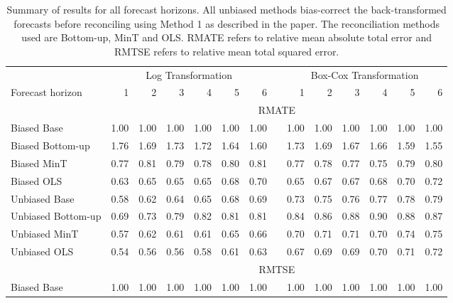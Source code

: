 \documentclass[12pt]{article}
\begin{document}
\begin{table}[htbp]
  \centering\footnotesize
  \caption{Summary of results for all forecast horizons.  All unbiased methods bias-correct the back-transformed forecasts before reconciling using Method 1 as described in the paper.  The reconciliation methods used are Bottom-up, MinT and OLS.  RMATE refers to relative mean absolute total error and RMTSE refers to relative mean total squared error.}
    \begin{tabular}{lrrrrrrrrrrrrr}
    \toprule
    & \multicolumn{6}{c}{Log Transformation}         &       & \multicolumn{6}{c}{Box-Cox Transformation} \\\cmidrule(lr){2-7}\cmidrule(lr){9-14}
    Forecast horizon  & 1     & 2     & 3     & 4     & 5     & 6     &       & 1     & 2     & 3     & 4     & 5     & 6 \\\midrule
          & \multicolumn{13}{c}{RMATE} \\ \cmidrule(lr){2-14}
    Biased Base             & 1.00  & 1.00  & 1.00  & 1.00  & 1.00  & 1.00  &       & 1.00  & 1.00  & 1.00  & 1.00  & 1.00  & 1.00 \\
    Biased Bottom-up        & 1.76  & 1.69  & 1.73  & 1.72  & 1.64  & 1.60  &       & 1.73  & 1.69  & 1.67  & 1.66  & 1.59  & 1.55 \\
    Biased MinT             & 0.77  & 0.81  & 0.79  & 0.78  & 0.80  & 0.81  &       & 0.77  & 0.78  & 0.77  & 0.75  & 0.79  & 0.80 \\
    Biased OLS              & 0.63  & 0.65  & 0.65  & 0.65  & 0.68  & 0.70  &       & 0.65  & 0.67  & 0.67  & 0.68  & 0.70  & 0.72 \\
    Unbiased Base           & 0.58  & 0.62  & 0.64  & 0.65  & 0.68  & 0.69  &       & 0.73  & 0.75  & 0.76  & 0.77  & 0.78  & 0.79 \\
    Unbiased Bottom-up      & 0.69  & 0.73  & 0.79  & 0.82  & 0.81  & 0.81  &       & 0.84  & 0.86  & 0.88  & 0.90  & 0.88  & 0.87 \\
    Unbiased MinT           & 0.57  & 0.62  & 0.61  & 0.61  & 0.65  & 0.66  &       & 0.70  & 0.71  & 0.71  & 0.70  & 0.74  & 0.75 \\
    Unbiased OLS            & 0.54  & 0.56  & 0.56  & 0.58  & 0.61  & 0.63  &       & 0.67  & 0.69  & 0.69  & 0.70  & 0.71  & 0.72 \\
          & \multicolumn{13}{c}{RMTSE} \\\cmidrule(lr){2-14}
    Biased Base             & 1.00  & 1.00  & 1.00  & 1.00  & 1.00  & 1.00  &       & 1.00  & 1.00  & 1.00  & 1.00  & 1.00  & 1.00 \\

\end{tabular}
\end{table}
\end{document}
